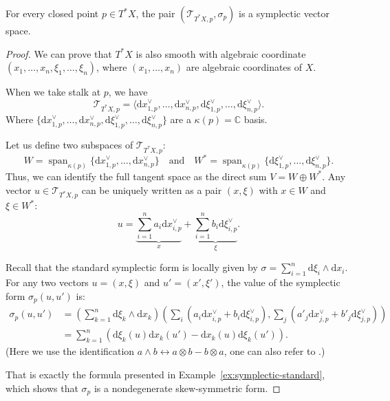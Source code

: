\begin{lemma}
    For every closed point $p\in T^\ast X$, the pair $(\mathcal{T}_{T^\ast X,p},\sigma_p)$ is
    a symplectic vector space.
\end{lemma}
\begin{proof}
    We can prove that $T^\ast X$ is also smooth with algebraic coordinate $(x_1,\dots,x_n,\xi_1,\dots,\xi_n)$, where $(x_1, \dots, x_n)$ are algebraic coordinates of $X$.

    When we take stalk at $p$, we have
    \[
        \mathcal{T}_{T^\ast X,p} = \langle \text{d}x_{1,p}^\vee, \dots, \text{d}x_{n,p}^\vee, \text{d}\xi_{1,p}^\vee, \dots, \text{d}\xi_{n,p}^\vee\rangle.
    \]
    Where
    $\{\text{d}x_{1,p}^\vee, \dots, \text{d}x_{n,p}^\vee, \text{d}\xi_{1,p}^\vee, \dots, \text{d}\xi_{n,p}^\vee\}$
    are a $\kappa(p)=\mathbb{C}$ basis.

    Let us define two subspaces of $\mathcal{T}_{T^{\ast}X, p}$:
    \[
        W = \operatorname{span}_{\kappa(p)}\{ \text{d}x_{1,p}^\vee, \dots, \text{d}x_{n,p}^\vee \} \quad \text{and} \quad W^{\ast} = \operatorname{span}_{\kappa(p)}\{ \text{d}\xi_{1,p}^\vee, \dots, \text{d}\xi_{n,p}^\vee \}.
    \]
    Thus, we can identify the full tangent space as the direct sum $V = W \oplus W^{\ast}$. Any vector $u \in \mathcal{T}_{T^{\ast}X, p}$ can be uniquely written as a pair $(x, \xi)$ with $x \in W$ and $\xi \in W^{\ast}$:
    \[
        u = \underbrace{\sum_{i=1}^n a_i \text{d}x_{i,p}^\vee}_{x} + \underbrace{\sum_{i=1}^n b_i \text{d}\xi_{i,p}^\vee}_{\xi}.
    \]

    Recall that the standard symplectic form is locally given by $\sigma = \sum_{i=1}^n \text{d}\xi_i \wedge \text{d}x_i$.
    For any two vectors $u = (x, \xi)$ and $u' = (x', \xi')$, the value of the symplectic form $\sigma_p(u, u')$ is:
    \begin{align*}
        \sigma_p(u, u') & = \left(\sum_{k=1}^n \text{d}\xi_k \wedge \text{d}x_k\right) \left( \sum_i (a_i \text{d}x_{i,p}^\vee + b_i \text{d}\xi_{i,p}^\vee), \sum_j (a'_j \text{d}x_{j,p}^\vee + b'_j \text{d}\xi_{j,p}^\vee) \right) \\
                        & = \sum_{k=1}^n \left( \text{d}\xi_k(u) \text{d}x_k(u') - \text{d}x_k(u) \text{d}\xi_k(u') \right).
    \end{align*}
    (Here we use the identification $a\wedge b \leftrightarrow a \otimes b - b \otimes a$, one can also refer to \cite[Theorem 7.6.10]{li2019algebraic}.)

    That is exactly the formula presented in Example~\ref{ex:symplectic-standard}, which shows that $\sigma_p$ is a nondegenerate skew-symmetric form.
\end{proof}


